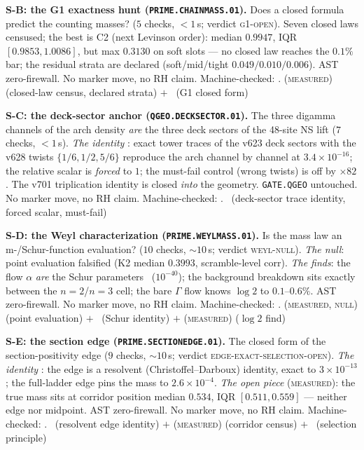 \documentclass[11pt,a4paper]{article}
\theoremstyle{definition}
\begin{document}
\par\smallskip\noindent\textbf{S-B: the G1 exactness hunt
(\texttt{PRIME.CHAINMASS.01}).}
Does a closed formula predict the counting masses? ($5$ checks,
${<}1$\,s; verdict \textsc{g1-open}).  Seven closed laws censused;
the best is C2 (next Levinson order): median $0.9947$, IQR
$[0.9853,1.0086]$, but max $0.3130$ on soft slots --- no closed law
reaches the $0.1\%$ bar; the residual strata are declared
(soft/mid/tight $0.049/0.010/0.006$).  AST zero-firewall.  No marker
move, no RH claim.
Machine-checked: .
(\textsc{measured}) (closed-law census, declared strata) $+$ \mO\
(G1 closed form)
\par\smallskip

\par\smallskip\noindent\textbf{S-C: the deck-sector anchor
(\texttt{QGEO.DECKSECTOR.01}).}
The three digamma channels of the arch density \emph{are} the three
deck sectors of the 48-site NS lift ($7$ checks, ${<}1$\,s).
\emph{The identity} \mE: exact tower traces of the v623 deck sectors
with the v628 twists $\{1/6,1/2,5/6\}$ reproduce the arch channel by
channel at $3.4\times10^{-16}$; the relative scalar is \emph{forced}
to $1$; the must-fail control (wrong twists) is off by $\times82$.
The v701 triplication identity is closed \emph{into} the geometry.
\texttt{GATE.QGEO} untouched.  No marker move, no RH claim.
Machine-checked: .
\mE\ (deck-sector trace identity, forced scalar, must-fail)
\par\smallskip

\par\smallskip\noindent\textbf{S-D: the Weyl characterization
(\texttt{PRIME.WEYLMASS.01}).}
Is the mass law an m-/Schur-function evaluation? ($10$ checks,
${\sim}10$\,s; verdict \textsc{weyl-null}).  \emph{The null}: point
evaluation falsified (K2 median $0.3993$, scramble-level corr).
\emph{The finds}: the flow $\alpha$ \emph{are} the Schur parameters
\mE\ ($10^{-40}$); the background breakdown sits exactly between the
$n=2$/$n=3$ cell; the bare $\Gamma$ flow knows $\log 2$ to
$0.1$--$0.6\%$.  AST zero-firewall.  No marker move, no RH claim.
Machine-checked: \veri{v706\_chain\_weyl\_mass.py}.
(\textsc{measured}, \textsc{null}) (point evaluation) $+$ \mE\
(Schur identity) $+$ (\textsc{measured}) ($\log 2$ find)
\par\smallskip

\par\smallskip\noindent\textbf{S-E: the section edge
(\texttt{PRIME.SECTIONEDGE.01}).}
The closed form of the section-positivity edge ($9$ checks,
${\sim}10$\,s; verdict \textsc{edge-exact-selection-open}).
\emph{The identity} \mE: the edge is a resolvent
(Christoffel--Darboux) identity, exact to $3\times10^{-13}$; the
full-ladder edge pins the mass to $2.6\times10^{-4}$.  \emph{The
open piece} (\textsc{measured}): the true mass sits at corridor
position median $0.534$, IQR $[0.511,0.559]$ --- neither edge nor
midpoint.  AST zero-firewall.  No marker move, no RH claim.
Machine-checked: \veri{v707\_chain\_section\_edge.py}.
\mE\ (resolvent edge identity) $+$ (\textsc{measured}) (corridor
census) $+$ \mO\ (selection principle)
\par\smallskip
\end{document}
